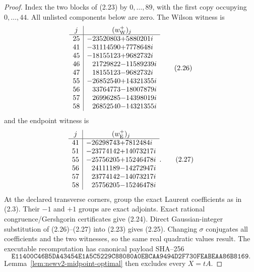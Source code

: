 \documentclass[11pt,oneside]{article}
\theoremstyle{definition}
\theoremstyle{remark}
\begin{document}
\begin{proof}
Index the two blocks of (2.23) by \(0,\ldots,89\), with the first
copy occupying \(0,\ldots,44\).  All unlisted components below are
zero.  The Wilson witness is
\[
\begin{array}{c|r@{}l}
j&\multicolumn{2}{c}{(w_{\mathrm W}^{+})_j}\\ \hline
25&-23520803&+5880201i\\
41&-31114590&+7778648i\\
45&-18155123&+9682732i\\
46& 21729822&-11589239i\\
47& 18155123&-9682732i\\
55&-26852540&+14321355i\\
56& 33764773&-18007879i\\
57& 26996285&-14398019i\\
58& 26852540&-14321355i
\end{array}                                                \tag{2.26}
\]
and the endpoint witness is
\[
\begin{array}{c|r@{}l}
j&\multicolumn{2}{c}{(w_{\mathrm E}^{+})_j}\\ \hline
41&-26298743&+7812484i\\
51&-23774142&+14073217i\\
55&-25756205&+15246478i\\
56& 24111189&-14272947i\\
57& 23774142&-14073217i\\
58& 25756205&-15246478i
\end{array}.                                               \tag{2.27}
\]
At the declared transverse corners, group the exact Laurent
coefficients as in (2.3).  Their \(-1\) and \(+1\) groups are exact
adjoints.  Exact rational congruence/Gershgorin certificates give
(2.24).  Direct Gaussian-integer substitution of (2.26)--(2.27)
into (2.23) gives (2.25).  Changing \(\sigma\) conjugates all
coefficients and the two witnesses, so the same real quadratic
values result.  The executable recomputation has canonical payload
SHA--256
\[
\texttt{E11400C46B5DA43454E1A5C5229C88080A0EBCAA9494D2F730FEABEAA86B8169}.
                                                               \tag{2.28}
\]
Lemma~\ref{lem:newv2-midpoint-optimal} then excludes every
\(X=tA\).
\end{proof}
\end{document}
